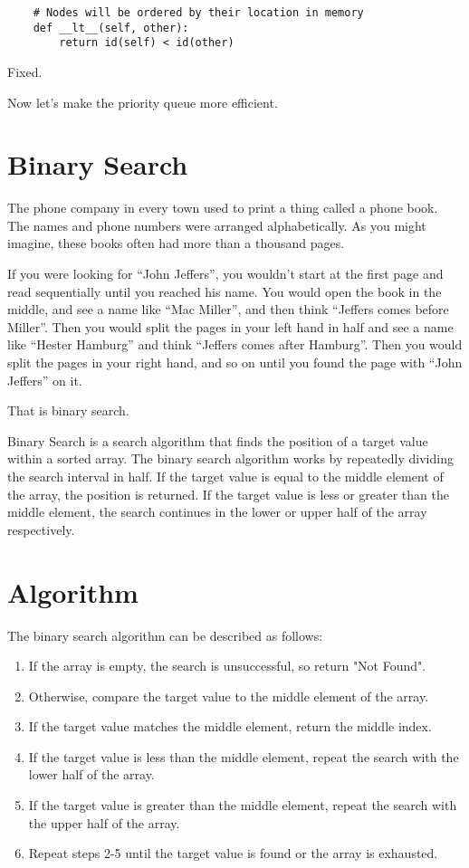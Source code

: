 \begin{verbatim}
    # Nodes will be ordered by their location in memory
    def __lt__(self, other):
        return id(self) < id(other)
\end{verbatim}

Fixed.

Now let's make the priority queue more efficient.

\section{Binary Search}

The phone company in every town used to print a thing called a phone
book. The names and phone numbers were arranged alphabetically.  As
you might imagine, these books often had more than a thousand pages.

If you were looking for ``John Jeffers'', you wouldn't start at the
first page and read sequentially until you reached his name.  You
would open the book in the middle, and see a name like ``Mac Miller'',
and then think ``Jeffers comes before Miller''.  Then you would split
the pages in your left hand in half and see a name like ``Hester
Hamburg'' and think ``Jeffers comes after Hamburg''.  Then you would
split the pages in your right hand, and so on until you found the page
with ``John Jeffers'' on it.

That is binary search.

Binary Search is a search algorithm that finds the position of a target value within a sorted array. The binary search algorithm works by repeatedly dividing the search interval in half. If the target value is equal to the middle element of the array, the position is returned. If the target value is less or greater than the middle element, the search continues in the lower or upper half of the array respectively.

\section{Algorithm}

The binary search algorithm can be described as follows:

\begin{enumerate}
\item If the array is empty, the search is unsuccessful, so return "Not Found".
\item Otherwise, compare the target value to the middle element of the array.
\item If the target value matches the middle element, return the middle index.
\item If the target value is less than the middle element, repeat the search with the lower half of the array.
\item If the target value is greater than the middle element, repeat the search with the upper half of the array.
\item Repeat steps 2-5 until the target value is found or the array is exhausted.
\end{enumerate}


